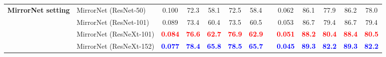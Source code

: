 \documentclass[journal]{IEEEtran}
\begin{document}
\begin{table*}[t]
{\begin{tabular}{|l|l|c|cc|cc|l|c|cc|cc|}
			\midrule


			\multirow{3}{*}{\textbf{MirrorNet setting}} 
			& MirrorNet (ResNet-50) & 0.100 & 72.3 & 58.1 & 72.5 & 58.4 &  & 0.062 & 86.1 & 77.9 & 86.2 & 78.0 \\
			& MirrorNet (ResNet-101) & 0.089 & 73.4 & 60.4 & 73.5 & 60.5 &  & 0.053 & 86.7 & 79.4 & 86.7 & 79.4 \\
			
			& MirrorNet (ResNeXt-101) & \textcolor{red}{\textbf{0.084}} & \textcolor{red}{\textbf{76.6}} & \textcolor{red}{\textbf{62.7}} & \textcolor{red}{\textbf{76.9}} & \textcolor{red}{\textbf{62.9}} &  & \textcolor{red}{\textbf{0.051}} & \textcolor{red}{\textbf{88.2}} & \textcolor{red}{\textbf{80.4}} & \textcolor{red}{\textbf{88.4}} & \textcolor{red}{\textbf{80.5}} \\
			& MirrorNet (ResNeXt-152) & \textcolor{blue}{\textbf{0.077}} & \textcolor{blue}{\textbf{78.4}} & \textcolor{blue}{\textbf{65.8}} & \textcolor{blue}{\textbf{78.5}} & \textcolor{blue}{\textbf{65.7}} &  & \textcolor{blue}{\textbf{0.045}} & \textcolor{blue}{\textbf{89.3}} & \textcolor{blue}{\textbf{82.2}} & \textcolor{blue}{\textbf{89.3}} & \textcolor{blue}{\textbf{82.2}} \\
			\bottomrule
		\end{tabular}
	}
\end{table*}
\end{document}
